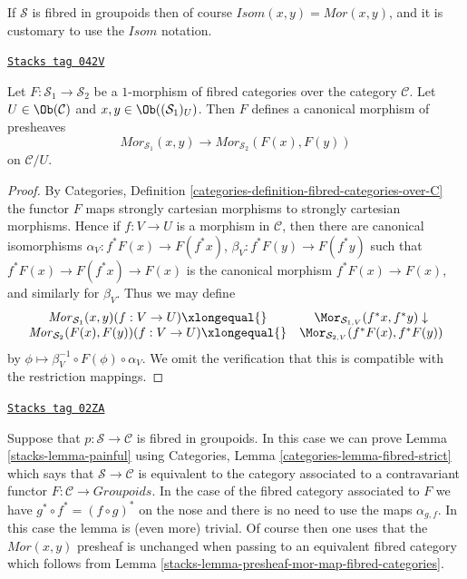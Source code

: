 If $\mathcal{S}$ is fibred in groupoids then of course
$\mathit{Isom}(x, y) = \mathit{Mor}(x, y)$, and it is
customary to use the $\mathit{Isom}$ notation.

\begin{lemma}
\label{stacks-lemma-presheaf-mor-map-fibred-categories}
\href{https://stacks.math.columbia.edu/tag/042V}{\texttt{Stacks tag 042V}}

Let $F : \mathcal{S}_1 \to \mathcal{S}_2$ be a $1$-morphism of fibred
categories over the category $\mathcal{C}$. Let $U \in \Ob(\mathcal{C})$
and $x, y\in \Ob((\mathcal{S}_1)_U)$. Then $F$ defines a canonical
morphism of presheaves
$$
\mathit{Mor}_{\mathcal{S}_1}(x, y)
\longrightarrow
\mathit{Mor}_{\mathcal{S}_2}(F(x), F(y))
$$
on $\mathcal{C}/U$.
\end{lemma}

\begin{proof}
By
Categories, Definition \ref{categories-definition-fibred-categories-over-C}
the functor $F$ maps strongly cartesian morphisms to strongly cartesian
morphisms. Hence if $f : V \to U$ is a morphism in $\mathcal{C}$, then
there are canonical isomorphisms $\alpha_V : f^*F(x) \to F(f^*x)$,
$\beta_V : f^*F(y) \to F(f^*y)$ such that $f^*F(x) \to F(f^*x) \to F(x)$
is the canonical morphism $f^*F(x) \to F(x)$, and similarly for $\beta_V$.
Thus we may define
$$
\begin{array}{cc}\mathit{Mor}_{\mathcal{S}_1}(x, y)(f : V \to U) \xlongequal{} & \Mor_{\mathcal{S}_{1, V}}(f^\ast x, f^\ast y) \downarrow \\ \mathit{Mor}_{\mathcal{S}_2}(F(x), F(y))(f : V \to U) \xlongequal{} & \Mor_{\mathcal{S}_{2, V}}(f^\ast F(x), f^\ast F(y))\end{array}
$$
by $\phi \mapsto \beta_V^{-1} \circ F(\phi) \circ \alpha_V$.
We omit the verification that this is compatible with the restriction
mappings.
\end{proof}

\begin{remark}[Alternative]
\label{stacks-remark-alternative}
\href{https://stacks.math.columbia.edu/tag/02ZA}{\texttt{Stacks tag 02ZA}}

Suppose that $p : \mathcal{S} \to \mathcal{C}$ is fibred in groupoids.
In this case we can prove
Lemma \ref{stacks-lemma-painful}
using
Categories, Lemma \ref{categories-lemma-fibred-strict}
which says that $\mathcal{S} \to \mathcal{C}$ is equivalent to the
category associated to a contravariant functor
$F : \mathcal{C} \to \textit{Groupoids}$.
In the case of the fibred category associated to $F$
we have $g^* \circ f^* = (f \circ g)^*$ on the nose
and there is no need to use the maps $\alpha_{g, f}$.
In this case the lemma is (even more) trivial. Of course then
one uses that the $\mathit{Mor}(x, y)$ presheaf is
unchanged when passing to an equivalent fibred category which follows from
Lemma \ref{stacks-lemma-presheaf-mor-map-fibred-categories}.
\end{remark}

